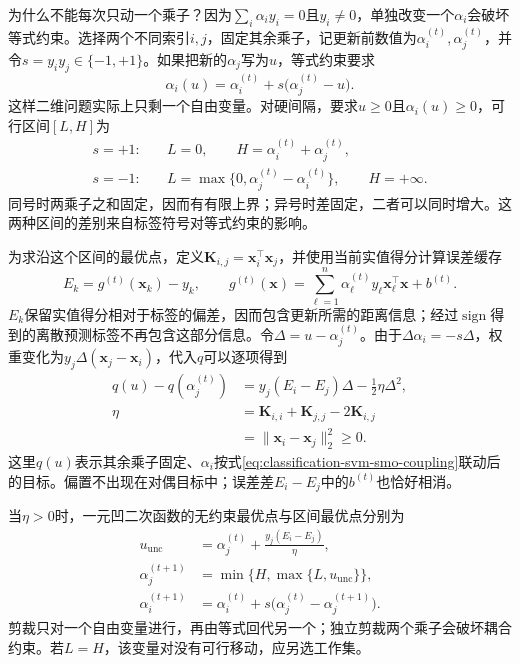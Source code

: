 为什么不能每次只动一个乘子？因为$\sum_i\alpha_i y_i=0$且$y_i\ne0$，单独改变一个$\alpha_i$会破坏等式约束。选择两个不同索引$i,j$，固定其余乘子，记更新前数值为$\alpha_i^{(t)},\alpha_j^{(t)}$，并令$s=y_i y_j\in\{-1,+1\}$。如果把新的$\alpha_j$写为$u$，等式约束要求
\begin{equation}
  \alpha_i(u)
  =\alpha_i^{(t)}
    +s\bigl(\alpha_j^{(t)}-u\bigr).
  \label{eq:classification-svm-smo-coupling}
\end{equation}
这样二维问题实际上只剩一个自由变量。对硬间隔，要求$u\ge0$且$\alpha_i(u)\ge0$，可行区间$[L,H]$为
\begin{equation}
  \begin{aligned}
    s=+1:\quad&
      L=0,\qquad H=\alpha_i^{(t)}+\alpha_j^{(t)},\\
    s=-1:\quad&
      L=\max\{0,\alpha_j^{(t)}-\alpha_i^{(t)}\},
      \qquad H=+\infty.
  \end{aligned}
  \label{eq:classification-svm-smo-hard-interval}
\end{equation}
同号时两乘子之和固定，因而有有限上界；异号时差固定，二者可以同时增大。这两种区间的差别来自标签符号对等式约束的影响。

为求沿这个区间的最优点，定义$\bm{K}_{i,j}=\bm{x}_i^{\top}\bm{x}_j$，并使用当前实值得分计算误差缓存
\[
  E_k=g^{(t)}(\bm{x}_k)-y_k,\qquad
  g^{(t)}(\bm{x})
  =\sum_{\ell=1}^n\alpha_\ell^{(t)}
     y_\ell\bm{x}_\ell^{\top}\bm{x}+b^{(t)}.
\]
$E_k$保留实值得分相对于标签的偏差，因而包含更新所需的距离信息；经过$\operatorname{sign}$得到的离散预测标签不再包含这部分信息。令$\Delta=u-\alpha_j^{(t)}$。由于$\Delta\alpha_i=-s\Delta$，权重变化为$y_j\Delta(\bm{x}_j-\bm{x}_i)$，代入$q$可以逐项得到
\begin{equation}
  \begin{aligned}
    q(u)-q(\alpha_j^{(t)})
      &=y_j(E_i-E_j)\Delta-\frac12\eta\Delta^2,\\
    \eta
      &=\bm{K}_{i,i}+\bm{K}_{j,j}-2\bm{K}_{i,j}\\
      &=\lVert\bm{x}_i-\bm{x}_j\rVert_2^2\ge0.
  \end{aligned}
  \label{eq:classification-svm-smo-gain}
\end{equation}
这里$q(u)$表示其余乘子固定、$\alpha_i$按式\eqref{eq:classification-svm-smo-coupling}联动后的目标。偏置不出现在对偶目标中；误差差$E_i-E_j$中的$b^{(t)}$也恰好相消。

当$\eta>0$时，一元凹二次函数的无约束最优点与区间最优点分别为
\begin{equation}
  \begin{aligned}
    u_{\mathrm{unc}}
      &=\alpha_j^{(t)}+\frac{y_j(E_i-E_j)}{\eta},\\
    \alpha_j^{(t+1)}
      &=\min\{H,\max\{L,u_{\mathrm{unc}}\}\},\\
    \alpha_i^{(t+1)}
      &=\alpha_i^{(t)}
        +s\bigl(\alpha_j^{(t)}-\alpha_j^{(t+1)}\bigr).
  \end{aligned}
  \label{eq:classification-svm-smo-update}
\end{equation}
剪裁只对一个自由变量进行，再由等式回代另一个；独立剪裁两个乘子会破坏耦合约束。若$L=H$，该变量对没有可行移动，应另选工作集。

